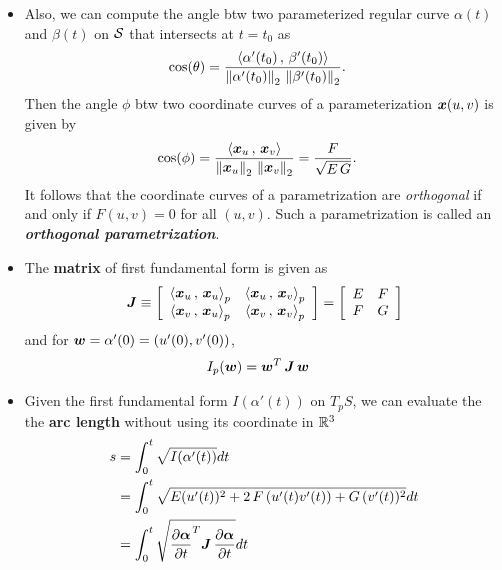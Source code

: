 \documentclass[11pt]{article}
\begin{document}
\begin{itemize}
\item Also, we can compute the angle btw two parameterized regular curve $\alpha(t)$ and $\beta(t)$ on ${\mathcal S}$ that intersects at $t=t_{0}$ as 
\begin{align*}
\cos(\theta) &= \frac{\left\langle \alpha'(t_{0})\,,\, \beta'(t_{0}) \right\rangle}{\left\|\alpha'(t_{0})\right\|_{2}\,\left\|\beta'(t_{0})\right\|_{2}}.
\end{align*}
Then the angle $\phi$ btw two coordinate curves of a parameterization $\boldsymbol{x}(u,v)$ is given by 
\begin{align}
\cos(\phi) &= \frac{\left\langle \boldsymbol{x}_{u}\,,\, \boldsymbol{x}_{v} \right\rangle}{\left\|\boldsymbol{x}_{u}\right\|_{2}\,\left\|\boldsymbol{x}_{v}\right\|_{2}} = \frac{F}{\sqrt{E\,G}}. \label{eqn: first_fund_angle_basis}
\end{align}
It follows that the coordinate curves of a parametrization are \emph{orthogonal} if and only if $F(u, v)  = 0$ for all $(u, v)$. Such a parametrization is called an \textbf{\emph{orthogonal parametrization}}.


\item The \textbf{matrix} of first fundamental form is given as 
\begin{align}
\boldsymbol{J}\equiv \left[\begin{array}{cc}
\left\langle \boldsymbol{x}_{u}\,,\, \boldsymbol{x}_{u} \right\rangle_{p} &  \left\langle \boldsymbol{x}_{u}\,,\, \boldsymbol{x}_{v} \right\rangle_{p} \\ 
 \left\langle \boldsymbol{x}_{v}\,,\, \boldsymbol{x}_{u} \right\rangle_{p} & \left\langle \boldsymbol{x}_{v}\,,\, \boldsymbol{x}_{v} \right\rangle_{p}
\end{array} \right] = 
\left[\begin{array}{cc}
E & F \\ 
F & G
\end{array} \right] \label{eqn: first_fund_form3}
\end{align}
and for $\boldsymbol{w} = \alpha'(0) = (u'(0), v'(0))$, 
\begin{align*}
I_{p}(\boldsymbol{w}) &= \boldsymbol{w}^{T}\,\boldsymbol{J}\,\boldsymbol{w}
\end{align*}

\item Given the first fundamental form $I(\alpha'(t))$ on $T_{p}S$, we can evaluate the the \textbf{arc length} without using its coordinate in ${\mathbb R}^{3}$ 
\begin{align}
s &= \int_{0}^{t} \sqrt{I(\alpha'(t))}  dt\nonumber\\
&= \int_{0}^{t} \sqrt{E(u'(t))^{2}+ 2\,F\,(u'(t)v'(t)) + G\,(v'(t))^{2}  }  dt \nonumber\\
&=  \int_{0}^{t} \sqrt{ \dfrac{\partial \boldsymbol{\alpha}}{ \partial t}^{T}\boldsymbol{J}\, \dfrac{\partial \boldsymbol{\alpha}}{ \partial t} }  dt  \label{eqn: arc_leng_2}
\end{align}


\end{itemize}
\end{document}
